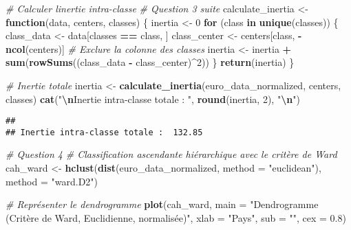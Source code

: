 \documentclass[
]{article}
\newenvironment{Shaded}{\begin{snugshade}}{\end{snugshade}}
\newcommand{\AttributeTok}[1]{\textcolor[rgb]{0.13,0.29,0.53}{#1}}
\newcommand{\CommentTok}[1]{\textcolor[rgb]{0.56,0.35,0.01}{\textit{#1}}}
\newcommand{\ControlFlowTok}[1]{\textcolor[rgb]{0.13,0.29,0.53}{\textbf{#1}}}
\newcommand{\DecValTok}[1]{\textcolor[rgb]{0.00,0.00,0.81}{#1}}
\newcommand{\FloatTok}[1]{\textcolor[rgb]{0.00,0.00,0.81}{#1}}
\newcommand{\FunctionTok}[1]{\textcolor[rgb]{0.13,0.29,0.53}{\textbf{#1}}}
\newcommand{\NormalTok}[1]{#1}
\newcommand{\OtherTok}[1]{\textcolor[rgb]{0.56,0.35,0.01}{#1}}
\newcommand{\SpecialCharTok}[1]{\textcolor[rgb]{0.81,0.36,0.00}{\textbf{#1}}}
\newcommand{\StringTok}[1]{\textcolor[rgb]{0.31,0.60,0.02}{#1}}
\begin{document}
\begin{Shaded}
\begin{Highlighting}[]
\CommentTok{\# Calculer l\textquotesingle{}inertie intra{-}classe}
\CommentTok{\# Question 3 suite }
\NormalTok{calculate\_inertia }\OtherTok{\textless{}{-}} \ControlFlowTok{function}\NormalTok{(data, centers, classes) \{}
\NormalTok{  inertia }\OtherTok{\textless{}{-}} \DecValTok{0}
  \ControlFlowTok{for}\NormalTok{ (class }\ControlFlowTok{in} \FunctionTok{unique}\NormalTok{(classes)) \{}
\NormalTok{    class\_data }\OtherTok{\textless{}{-}}\NormalTok{ data[classes }\SpecialCharTok{==}\NormalTok{ class, ]}
\NormalTok{    class\_center }\OtherTok{\textless{}{-}}\NormalTok{ centers[class, }\SpecialCharTok{{-}}\FunctionTok{ncol}\NormalTok{(centers)]  }\CommentTok{\# Exclure la colonne des classes}
\NormalTok{    inertia }\OtherTok{\textless{}{-}}\NormalTok{ inertia }\SpecialCharTok{+} \FunctionTok{sum}\NormalTok{(}\FunctionTok{rowSums}\NormalTok{((class\_data }\SpecialCharTok{{-}}\NormalTok{ class\_center)}\SpecialCharTok{\^{}}\DecValTok{2}\NormalTok{))}
\NormalTok{  \}}
  \FunctionTok{return}\NormalTok{(inertia)}
\NormalTok{\}}

\CommentTok{\# Inertie totale}
\NormalTok{inertia }\OtherTok{\textless{}{-}} \FunctionTok{calculate\_inertia}\NormalTok{(euro\_data\_normalized, centers, classes)}
\FunctionTok{cat}\NormalTok{(}\StringTok{"}\SpecialCharTok{\textbackslash{}n}\StringTok{Inertie intra{-}classe totale : "}\NormalTok{, }\FunctionTok{round}\NormalTok{(inertia, }\DecValTok{2}\NormalTok{), }\StringTok{"}\SpecialCharTok{\textbackslash{}n}\StringTok{"}\NormalTok{)}
\end{Highlighting}
\end{Shaded}

\begin{verbatim}
## 
## Inertie intra-classe totale :  132.85
\end{verbatim}

\begin{Shaded}
\begin{Highlighting}[]
\CommentTok{\# Question 4 }
\CommentTok{\# Classification ascendante hiérarchique avec le critère de Ward}
\NormalTok{cah\_ward }\OtherTok{\textless{}{-}} \FunctionTok{hclust}\NormalTok{(}\FunctionTok{dist}\NormalTok{(euro\_data\_normalized, }\AttributeTok{method =} \StringTok{"euclidean"}\NormalTok{), }\AttributeTok{method =} \StringTok{"ward.D2"}\NormalTok{)}

\CommentTok{\# Représenter le dendrogramme}
\FunctionTok{plot}\NormalTok{(cah\_ward, }
     \AttributeTok{main =} \StringTok{"Dendrogramme (Critère de Ward, Euclidienne, normalisée)"}\NormalTok{, }
     \AttributeTok{xlab =} \StringTok{"Pays"}\NormalTok{, }\AttributeTok{sub =} \StringTok{""}\NormalTok{, }\AttributeTok{cex =} \FloatTok{0.8}\NormalTok{)}
\end{Highlighting}
\end{Shaded}
\end{document}
